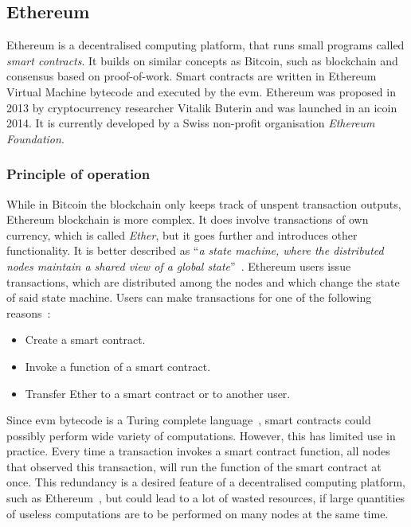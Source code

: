 \subsection{Ethereum}

Ethereum is a decentralised computing platform, that runs small programs called \textit{smart contracts}. It builds on similar concepts as Bitcoin, such as blockchain and consensus based on proof-of-work. Smart contracts are written in Ethereum Virtual Machine bytecode and executed by the \acrfull{evm}. Ethereum was proposed in 2013 by cryptocurrency researcher Vitalik Buterin and was launched in an \acrlong{ico}\footnotemark  in 2014. 
% 
% 
It is currently developed by a Swiss non-profit organisation \textit{Ethereum Foundation}.\footnotemark
% 

\subsubsection{Principle of operation}
While in Bitcoin the blockchain only keeps track of unspent transaction outputs, Ethereum blockchain is more complex. It does involve transactions of own currency, which is called \textit{Ether}, but it goes further and introduces other functionality. It is better described as ``\textit{a state machine, where the distributed nodes maintain a shared view of a global state}''~\cite{Tikhomirov2018Ethereum:Perspectives}. Ethereum users issue transactions, which are distributed among the nodes and which change the state of said state machine. Users can make transactions for one of the following reasons~\cite{Atzei2017ASoK}:
\begin{itemize}[noitemsep]
    \item Create a smart contract.
    \item Invoke a function of a smart contract.
    \item Transfer Ether to a smart contract or to another user.
\end{itemize}

Since \acrshort{evm} bytecode is a Turing complete language~\cite{Tikhomirov2018Ethereum:Perspectives, Atzei2017ASoK, Dannen2017IntroducingSolidity}, smart contracts could possibly perform wide variety of computations. However, this has limited use in practice. Every time a transaction invokes a smart contract function, all nodes that observed this transaction, will run the function of the smart contract at once. This redundancy is a desired feature of a decentralised computing platform, such as Ethereum~\cite{EthereumCommunityEthereumDocumentation}, but could lead to a lot of wasted resources, if large quantities of useless computations are to be performed on many nodes at the same time.

